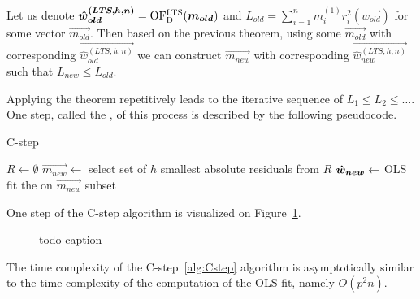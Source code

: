 Let us denote $\boldsymbol{\hat{w}_{old}^{(LTS, h, n)}} = \operatorname{OF^{LTS}_D}(\boldsymbol{m_{old}})$ and 
$L_{old} = \sum\limits_{i=1}^n m^{(1)}_i r_{i}^2(\vec{w_{old}})$ for some vector $\vec{m_{old}}$. Then based on the previous theorem, using some $\vec{m_{old}}$ with corresponding $\vec{\hat{w}_{old}^{(LTS, h, n)}}$ we can construct $\vec{m_{new}}$ with corresponding $\vec{\hat{w}_{new}^{(LTS, h, n)}}$ such that $L_{new} \leq L_{old}$. 

Applying the theorem repetitively leads to the iterative sequence of
$L_{1} \leq L_{2} \leq \ldots$. One step, called the , of this process is described by the following pseudocode.

\begin{algorithm}[H]
    \label{alg:Cstep}
    \caption{C-step}
    $R \gets \emptyset$\;
    $\vec{m_{new}} \gets $ select set of $h$ smallest absolute residuals from $R$\;
    $\boldsymbol{\hat{w}_{new}} \gets$ OLS fit the on $\vec{m_{new}}$ subset\;
    \;
\end{algorithm}

One step of the C-step algorithm is visualized on Figure~\ref{figure:one:c:step}.


\begin{figure}[h]
    \centering
    \caption{todo caption}
    \label{figure:one:c:step}
\end{figure}
    


\begin{observation} \label{csteptimecomplexity}
    The time complexity of the C-step~\ref{alg:Cstep} algorithm is asymptotically similar to the time complexity of the computation of the OLS fit, namely $O(p^2n)$.
\end{observation} 

